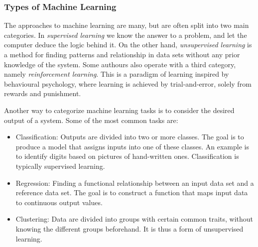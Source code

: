 \documentclass{beamer}
\begin{document}
\begin{frame}
\frametitle{Types of Machine Learning}

\begin{block}{}
The approaches to machine learning are many, but are often split into two main categories. 
In \emph{supervised learning} we know the answer to a problem,
and let the computer deduce the logic behind it. On the other hand, \emph{unsupervised learning}
is a method for finding patterns and relationship in data sets without any prior knowledge of the system.
Some authours also operate with a third category, namely \emph{reinforcement learning}. This is a paradigm 
of learning inspired by behavioural psychology, where learning is achieved by trial-and-error, 
solely from rewards and punishment.

Another way to categorize machine learning tasks is to consider the desired output of a system.
Some of the most common tasks are:

\begin{itemize}
  \item Classification: Outputs are divided into two or more classes. The goal is to   produce a model that assigns inputs into one of these classes. An example is to identify  digits based on pictures of hand-written ones. Classification is typically supervised learning.

  \item Regression: Finding a functional relationship between an input data set and a reference data set.   The goal is to construct a function that maps input data to continuous output values.

  \item Clustering: Data are divided into groups with certain common traits, without knowing the different groups beforehand.  It is thus a form of unsupervised learning.
\end{itemize}

\noindent
\end{block}
\end{frame}
\end{document}
